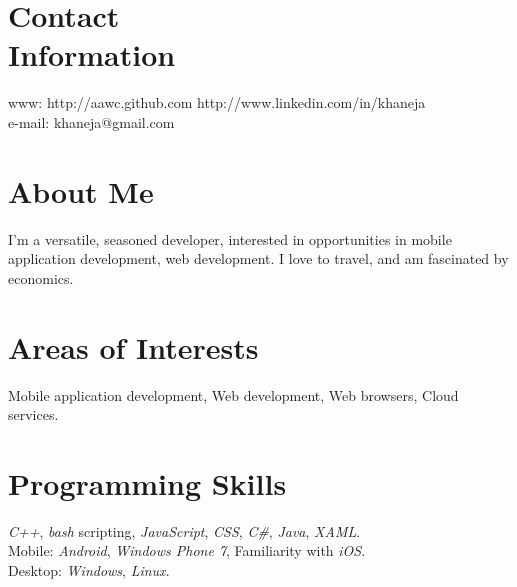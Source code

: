 \documentclass[margin,line]{resume}
\begin{document}
	\begin{resume}
	
	\section{\mysidestyle Contact\\Information}
	
	www: http://aawc.github.com \hfill http://www.linkedin.com/in/khaneja\vspace{0mm}\\\vspace{0mm}%
	e-mail: khaneja@gmail.com    \hfill \vspace{0mm}%

	\section{\mysidestyle About Me}
	I'm a versatile, seasoned developer, interested in opportunities in mobile application development, web development. I love to travel, and am fascinated by economics.
	\section{\mysidestyle Areas of Interests}
	Mobile application development, Web development, Web browsers, Cloud services.
	\section{\mysidestyle Programming Skills}
	\textit{C++}, \textit{bash} scripting, \textit{JavaScript}, \textit{CSS}, \textit{C\#}, \textit{Java}, \textit{XAML}.\\
	Mobile: \textit{Android}, \textit{Windows Phone 7}, Familiarity with \textit{iOS}.\\
	Desktop: \textit{Windows}, \textit{Linux}.


\end{resume}
\end{document}
